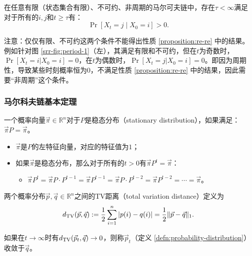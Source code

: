     \begin{proposition}
        \label{proposition:re-re}
        在任意有限（状态集合有限）、不可约、非周期的马尔可夫链中，存在$\tau<\infty$满足对于所有的$i,j$和$t\ge \tau$有：
        \[
            \Pr[X_t=j\mid X_0=i]>0.
        \]
    \end{proposition}

    注意：仅仅有限、不可约这两个条件不能得出性质 \ref{proposition:re-re} 中的结果。例如针对图 \ref{srr-fig:period-1}（左），其满足有限和不可约，但在$t$为奇数时，$\Pr[X_t=i|X_0=i]=0$，在$t$为偶数时，$\Pr[X_t=j|X_0=i]=0$。即因为周期性，导致某些时刻概率恒为$0$，不满足性质 \ref{proposition:re-re} 中的结果，因此需要“非周期”这个条件。



    \subsubsection{马尔科夫链基本定理}
        
    \begin{definition}[稳态分布]
        \label{defn:stationary-distribution}
        一个概率向量$\vec{\pi}\in\mathbb{R}^n$对于$P$是稳态分布（stationary distribution），如果满足：$\vec{\pi}P=\vec{\pi}$。
    \end{definition}

    \begin{itemize}
        \item $\vec{\pi}$是$P$的左特征向量，对应的特征值为$1$；
        \item 如果$\vec{\pi}$是稳态分布，那么对于所有的$t>0$有$\vec{\pi}P^t=\vec{\pi}$：
        \begin{itemize}
            \item $\vec{\pi}P^t=\vec{\pi}P\cdot P^{t-1}=\vec{\pi}P^{t-1}=\vec{\pi}P\cdot P^{t-2}=\vec{\pi}P^{t-2}=\cdots=\vec{\pi}$。
        \end{itemize}
    \end{itemize}

    \begin{definition}[TV距离]
        \label{defn:tv-distance}
        两个概率分布$\vec{p},\vec{q}\in\mathbb{R}^n$之间的TV距离（total variation distance）定义为
        \[
            d_{\textup{TV}}(\vec{p},\vec{q}):=\frac{1}{2}\sum_{i=1}^n{|p(i)-q(i)|}=\frac{1}{2}\lVert \vec{p}-\vec{q}\rVert_1.
        \]
    \end{definition}

    如果在$t\rightarrow \infty$时有$d_{\textup{TV}}(\vec{p}_t,\vec{q})\rightarrow 0$，则称$\vec{p}_t$（定义 \ref{defn:probability-distribution}）收敛于$\vec{q}$。

